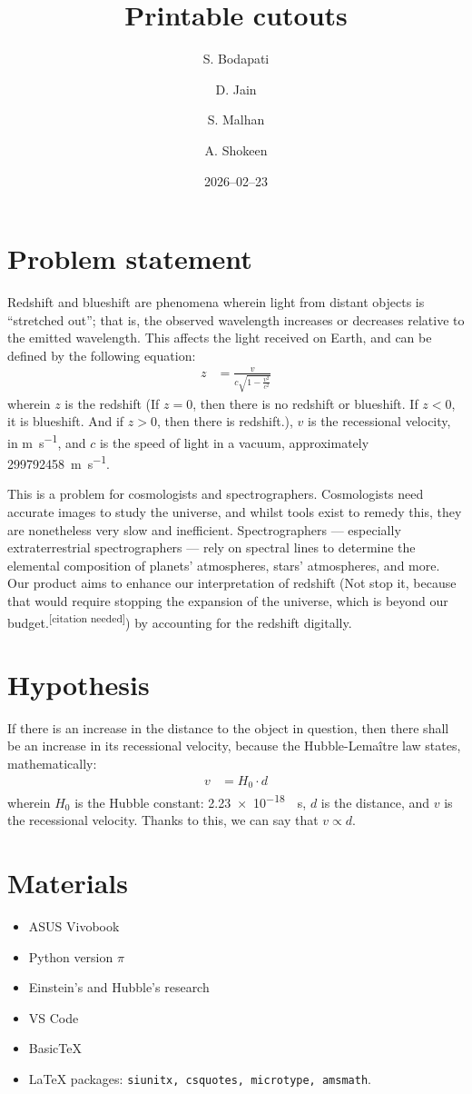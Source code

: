 \documentclass{article}
\title{Printable cutouts}
\date{2026--02--23}
\author{S. Bodapati \and D. Jain \and S. Malhan \and A. Shokeen}
\begin{document}
\maketitle
\section{Problem statement}
Redshift and blueshift are phenomena wherein light from distant objects is ``stretched out''; that is, the observed wavelength increases or decreases relative to the emitted wavelength. This affects the light received on Earth, and can be defined by the following equation:
\begin{align}
    z &= \frac{v}{c\sqrt{1 - \frac{v^2}{c^2}}}
\end{align}
wherein \(z\) is the redshift (If \(z = 0\), then there is no redshift or blueshift. If \(z < 0\), it is blueshift. And if \(z > 0\), then there is redshift.), \(v\) is the recessional velocity, in \unit{\metre\per\second}, and \(c\) is the speed of light in a vacuum, approximately \qty{299 792 458}{\metre\per\second}.

This is a problem for cosmologists and spectrographers. Cosmologists need accurate images to study the universe, and whilst tools exist to remedy this, they are nonetheless very slow and inefficient. Spectrographers --- especially extraterrestrial spectrographers --- rely on spectral lines to determine the elemental composition of planets' atmospheres, stars' atmospheres, and more. Our product aims to enhance our interpretation of redshift (Not stop it, because that would require stopping the expansion of the universe, which is beyond our budget.\textsuperscript{[citation needed]}) by accounting for the redshift digitally.

\section{Hypothesis}
If there is an increase in the distance to the object in question, then there shall be an increase in its recessional velocity, because the Hubble-Lemaître law states, mathematically:
\begin{align}
    v &= H_0 \cdot d
\end{align}
wherein \(H_0\) is the Hubble constant: \qty{2.23e-18}{\per\second}, \(d\) is the distance, and \(v\) is the recessional velocity. Thanks to this, we can say that \(v \propto d\).

\section{Materials}
\begin{itemize}
    \item ASUS Vivobook
    \item Python version \(\pi\)
    \item Einstein's and Hubble's research
    \item VS Code
    \item Basic\TeX
    \item \LaTeX{} packages: \verb|siunitx, csquotes, microtype, amsmath|.
\end{itemize}
\end{document}
